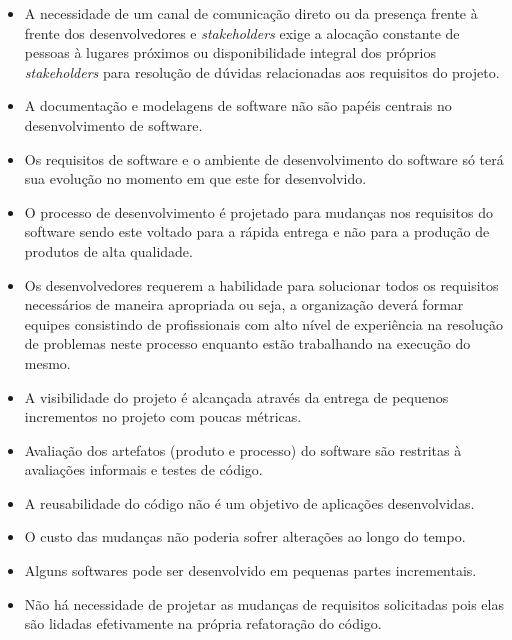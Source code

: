 \begin{itemize}
    \item A necessidade de um canal de comunicação direto ou da presença frente à frente dos desenvolvedores e \textit{stakeholders} exige 
    a alocação constante de pessoas à lugares próximos ou disponibilidade integral dos próprios \textit{stakeholders} para resolução de dúvidas relacionadas aos requisitos do projeto.
    
    \item A documentação e modelagens de software não são papéis centrais no desenvolvimento de software.
    
    \item Os requisitos de software e o ambiente de desenvolvimento do software só terá sua evolução no momento em que este for desenvolvido.
    
    \item O processo de desenvolvimento é projetado para mudanças nos requisitos do software sendo este voltado para a rápida entrega e não para a produção de produtos de alta qualidade.
    
    \item Os desenvolvedores requerem a habilidade para solucionar todos os requisitos necessários de maneira apropriada ou seja, a organização deverá formar equipes consistindo de profissionais com alto nível de experiência na resolução de problemas neste processo enquanto estão trabalhando na execução do mesmo.
    
    \item A visibilidade do projeto é alcançada através da entrega de pequenos incrementos no projeto com poucas métricas.
    
    \item Avaliação dos artefatos (produto e processo) do software são restritas à avaliações informais e testes de código.
    
    \item A reusabilidade do código não é um objetivo de aplicações desenvolvidas.
    
    \item O custo das mudanças não poderia sofrer alterações ao longo do tempo.
    
    \item Alguns softwares pode ser desenvolvido em pequenas partes incrementais.
    
    \item Não há necessidade de projetar as mudanças de requisitos solicitadas pois elas são lidadas efetivamente na própria refatoração do código.
    
\end{itemize}

